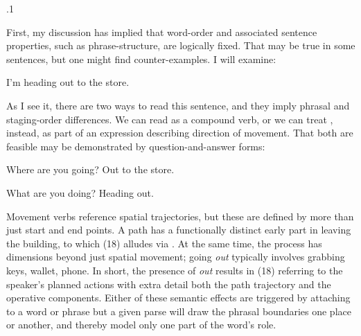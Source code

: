 \documentclass[11pt, twocolumn]{article}
\begin{document}
\p.1{%
\:\+First, my discussion has implied that word-order and associated
sentence properties, such as phrase-structure, are logically
fixed. \> \pgl{}That
may be true in some sentences, but one might find
counter-examples. \>  I will examine:

\begin{exsGroup}

\exsItem{}  \>  I'm heading out to the store. \> 

\end{exsGroup}

\nip{}%
As I see it, there are two ways to read this sentence, and they imply phrasal
and staging-order differences. \>  We can read  as a compound
verb, or we can treat , instead, as part of an expression describing
direction of movement. \>  That both are feasible may be demonstrated by
question-and-answer forms:

\begin{exsGroup}

\exsItem{}  \>  Where are you going? \>  Out to the store. {\sssm}

\exsItem{}  \>  What are you doing? \>  Heading out. \> 

\end{exsGroup}

\nip{}%
Movement verbs reference spatial trajectories, but these are
defined by more than just start and end points. \>  A path
 has a functionally distinct early part in leaving
the building, to which \exsRef(18) alludes via . \>  At the same time,
the process has dimensions beyond just spatial movement; going
\textit{out} typically involves grabbing keys, wallet, phone. \> 
In short, the presence of \textit{out} results in \exsRef(18) referring to
the speaker's planned actions with extra detail both \visavis{} the
path trajectory and the operative components. \>  Either of these
semantic effects are triggered by attaching  to a word
or phrase \mdash{} but a given parse will draw the phrasal boundaries
one place or another, and thereby model only one part of the word's role.\<\;
}%
\end{document}
